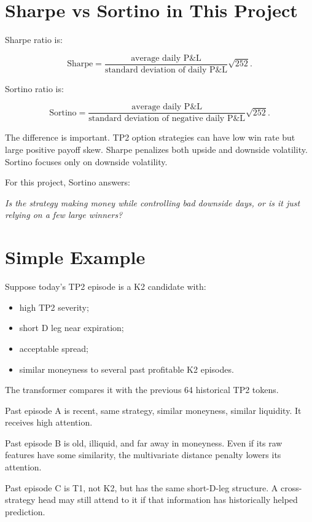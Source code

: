 \documentclass[11pt]{article}
\newcommand{\1}{\mathbf{1}}
\begin{document}
\section{Sharpe vs Sortino in This Project}

Sharpe ratio is:

\[
  \text{Sharpe}
  =
  \frac{\text{average daily P\&L}}{\text{standard deviation of daily P\&L}}
  \sqrt{252}.
\]

Sortino ratio is:

\[
  \text{Sortino}
  =
  \frac{\text{average daily P\&L}}{\text{standard deviation of negative daily P\&L}}
  \sqrt{252}.
\]

The difference is important. TP2 option strategies can have low win rate but
large positive payoff skew. Sharpe penalizes both upside and downside
volatility. Sortino focuses only on downside volatility.

For this project, Sortino answers:

\begin{center}
\textit{Is the strategy making money while controlling bad downside days, or is
it just relying on a few large winners?}
\end{center}

\section{Simple Example}

Suppose today's TP2 episode is a K2 candidate with:

\begin{itemize}[leftmargin=*]
  \item high TP2 severity;
  \item short D leg near expiration;
  \item acceptable spread;
  \item similar moneyness to several past profitable K2 episodes.
\end{itemize}

The transformer compares it with the previous 64 historical TP2 tokens.

Past episode A is recent, same strategy, similar moneyness, similar liquidity.
It receives high attention.

Past episode B is old, illiquid, and far away in moneyness. Even if its raw
features have some similarity, the multivariate distance penalty lowers its
attention.

Past episode C is T1, not K2, but has the same short-D-leg structure. A
cross-strategy head may still attend to it if that information has historically
helped prediction.
\end{document}

